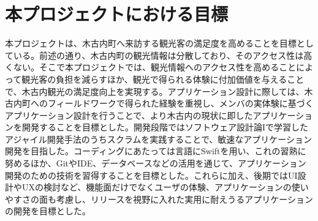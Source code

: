 \section{本プロジェクトにおける目標}
本プロジェクトは、木古内町へ来訪する観光客の満足度を高めることを目標としている。前述の通り、木古内町の観光情報は分散しており、そのアクセス性は高くない。そこで本プロジェクトでは、観光情報へのアクセス性を高めることによって観光客の負担を減らすほか、観光で得られる体験に付加価値を与えることで、木古内観光の満足度向上を実現する。アプリケーション設計に際しては、木古内町へのフィールドワークで得られた経験を重視し、メンバの実体験に基づくアプリケーション設計を行うことで、より木古内の現状に即したアプリケーションを開発することを目標とした。開発段階ではソフトウェア設計論Iで学習したアジャイル開発手法のうちスクラムを実践することで、敏速なアプリケーション開発を目指した。コーディングにあたっては言語にSwiftを用い、これの習熟に努めるほか、GitやIDE、データベースなどの活用を通じて、アプリケーション開発のための技術を習得することを目標とした。これらに加え、後期ではUI設計やUXの検討など、機能面だけでなくユーザの体験、アプリケーションの使いやすさの面も考慮し、リリースを視野に入れた実用に耐えうるアプリケーションの開発を目標とした。
